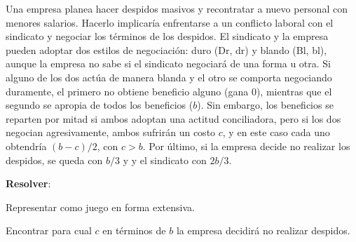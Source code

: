 \documentclass[12pt]{scrartcl}
\begin{document}
Una empresa planea hacer despidos masivos y recontratar a nuevo personal con menores salarios. Hacerlo implicaría enfrentarse a un conflicto laboral con el sindicato y negociar los términos de los despidos. El sindicato y la empresa pueden adoptar dos estilos de negociación: duro (Dr, dr) y blando (Bl, bl), aunque la empresa no sabe si el sindicato negociará de una forma u otra. Si alguno de los dos actúa de manera blanda y el otro se comporta negociando duramente, el primero no obtiene beneficio alguno (gana 0), mientras que el segundo se apropia de todos los beneficios ($b$). Sin embargo, los beneficios se reparten por mitad si ambos adoptan una actitud conciliadora, pero si los dos negocian agresivamente, ambos sufrirán un costo $c$, y en este caso cada uno obtendría $(b-c)/2$, con $c > b$. Por último, si la empresa decide no realizar los despidos, se queda con $b/3$ y y el sindicato con $2b/3$.

\textbf{Resolver}:

\begin{myenum}
	\item Representar como juego en forma extensiva.
	\item Encontrar para cual $c$ en términos de $b$ la empresa decidirá no realizar despidos.
\end{myenum}
\end{document}
